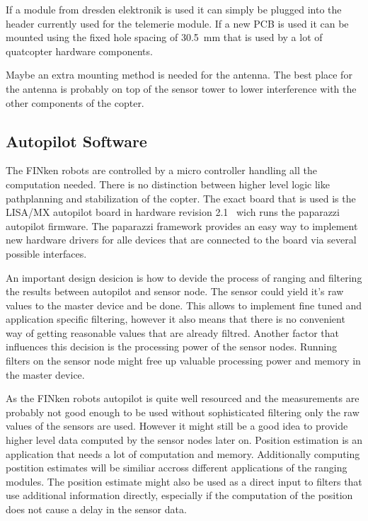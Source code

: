 If a module from dresden elektronik is used it can simply be plugged into the header currently used for the telemerie module.
If a new PCB is used it can be mounted using the fixed hole spacing of \SI{30.5}{mm} that is used by a lot of quatcopter hardware components.

Maybe an extra mounting method is needed for the antenna.
The best place for the antenna is probably on top of the sensor tower to lower interference with the other components of the copter.

\subsection{Autopilot Software}
The FINken robots are controlled by a micro controller handling all the computation needed.
There is no distinction between higher level logic like pathplanning and stabilization of the copter.
The exact board that is used is the LISA/MX autopilot board in hardware revision 2.1~\cite{lisamx} wich runs the paparazzi autopilot firmware\cite{paparazzi}.
The paparazzi framework provides an easy way to implement new hardware drivers for alle devices that are connected to the board via several possible interfaces.

An important design desicion is how to devide the process of ranging and filtering the results between autopilot and sensor node.
The sensor could yield it's raw values to the master device and be done.
This allows to implement fine tuned and application specific filtering, however it also means that there is no convenient way of getting reasonable values that are already filtred.
Another factor that influences this decision is the processing power of the sensor nodes.
Running filters on the sensor node might free up valuable processing power and memory in the master device.

As the FINken robots autopilot is quite well resourced and the measurements are probably not good enough to be used without sophisticated filtering only the raw values of the sensors are used.
However it might still be a good idea to provide higher level data computed by the sensor nodes later on.
Position estimation is an application that needs a lot of computation and memory.
Additionally computing postition estimates will be similiar accross different applications of the ranging modules.
The position estimate might also be used as a direct input to filters that use additional information directly, especially if the computation of the position does not cause a delay in the sensor data.



